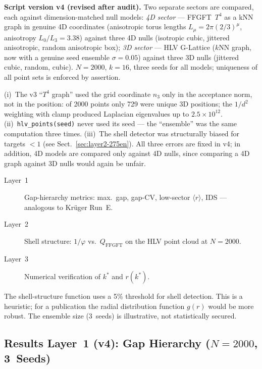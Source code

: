 \textbf{Script version v4 (revised after audit).} Two separate
sectors are compared, each against dimension-matched null models:
\emph{4D sector} --- FFGFT~$T^4$ as a kNN graph in genuine 4D
coordinates (anisotropic torus lengths $L_\mu = 2\pi(2/3)^\mu$,
anisotropy $L_0/L_3 = 3.38$) against three 4D nulls (isotropic cubic,
jittered anisotropic, random anisotropic box); \emph{3D sector} ---
HLV G-Lattice ($k$NN graph, now with a genuine seed ensemble
$\sigma=0.05$) against three 3D nulls (jittered cubic, random, cubic).
$N=2000$, $k=16$, three seeds for all models; uniqueness of all point
sets is enforced by assertion.

\begin{remark}
(i)~The v3 \enquote{$T^4$ graph} used the grid coordinate $n_3$ only
in the acceptance norm, not in the position: of 2000 points only 729
were unique 3D positions; the $1/d^2$ weighting with clamp produced
Laplacian eigenvalues up to $2.5\times10^{12}$.
(ii)~\texttt{hlv\_points(seed)} never used its seed --- the
\enquote{ensemble} was the same computation three times.
(iii)~The shell detector was structurally biased for targets $<1$
(see Sect.~\ref{sec:layer2-275en}). All three errors are fixed in v4;
in addition, 4D models are compared only against 4D nulls, since
comparing a 4D graph against 3D nulls would again be unfair.
\end{remark}

\begin{description}
  \item[Layer~1] Gap-hierarchy metrics: max.\ gap, gap-CV,
    low-sector $\langle r\rangle$, IDS --- analogous to Krüger Run~E.
  \item[Layer~2] Shell structure: $1/\varphi$ vs.\ $Q_\mathrm{FFGFT}$
    on the HLV point cloud at $N=2000$.
  \item[Layer~3] Numerical verification of $k^*$ and $r(k^*)$.
\end{description}

\begin{remark}
The shell-structure function uses a 5\% threshold for shell detection.
This is a heuristic; for a publication the radial distribution function
$g(r)$ would be more robust. The ensemble size (3~seeds) is illustrative,
not statistically secured.
\end{remark}

\subsection{Results Layer~1 (v4): Gap Hierarchy ($N=2000$, 3~Seeds)}

